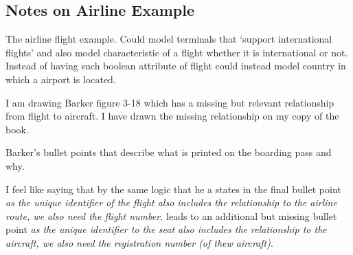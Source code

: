 \subsection{Notes on Airline Example}
\begin{noteforfuture}
 The airline flight example. Could model terminals that `support international flights' and also
 model characteristic of a flight whether it is international or not. Instead of having such boolean attribute of flight could instead model country in which a airport is located. 
\end{noteforfuture}
\begin{noteforfuture}
I am drawing Barker figure 3-18 which has a missing but relevant relationship from flight to aircraft.
I have drawn the missing relationship on my copy of the book.

Barker's bullet points that describe what is printed on the boarding pass and why.

I feel like saying that by the same logic that he a
states  in the final bullet point
\textit{as the unique identifier of the flight also includes the relationship to the airline route, we also need the flight number.}
leads to an additional but missing bullet point
\textit{as the unique identifier to the seat also includes the relationship to the aircraft, we also need the registration number (of thew aircraft)}.


\end{noteforfuture}

